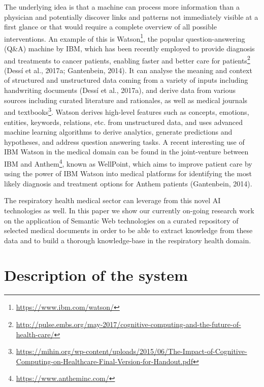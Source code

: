 \documentclass[runningheads,a4paper]{llncs}
\begin{document}
The underlying idea is that a machine can process more information than a physician and potentially discover links and patterns not immediately visible at a first glance or that would require a complete overview of all possible interventions. An example of this is Watson\footnote{\url{https://www.ibm.com/watson/}}, the popular question-answering (Q\&A) machine by IBM, which has been recently employed to provide diagnosis and treatments to cancer patients, enabling faster and better care for patients\footnote{\url{http://pulse.embs.org/may-2017/cognitive-computing-and-the-future-of-health-care/}} (Dess\'i et al., 2017a; Gantenbein, 2014). It can analyse the meaning and context of structured and unstructured data coming from a variety of inputs including handwriting documents (Dess\'i et al., 2017a), and derive data from various sources including curated literature and rationales, as well as medical journals and textbooks\footnote{\url{https://mihin.org/wp-content/uploads/2015/06/The-Impact-of-Cognitive-Computing-on-Healthcare-Final-Version-for-Handout.pdf}}. Watson derives high-level features such as concepts, emotions, entities, keywords, relations, etc. from unstructured data, and uses advanced machine learning algorithms to derive analytics, generate predictions and hypotheses, and address question answering tasks. A recent interesting use of IBM Watson in the medical domain can be found in the joint-venture between IBM and Anthem\footnote{\url{https://www.antheminc.com/}}, known as WellPoint, which aims to improve patient care by using the power of IBM Watson into medical platforms for identifying the most likely diagnosis and treatment options for Anthem patients (Gantenbein, 2014).

The respiratory health medical sector can leverage from this novel AI technologies as well. In this paper we show our currently on-going research work on the application of Semantic Web technologies on a curated repository of selected medical documents in order to be able to extract knowledge from these data and to build a thorough knowledge-base in the respiratory health domain.

\section{Description of the system}
\end{document}
